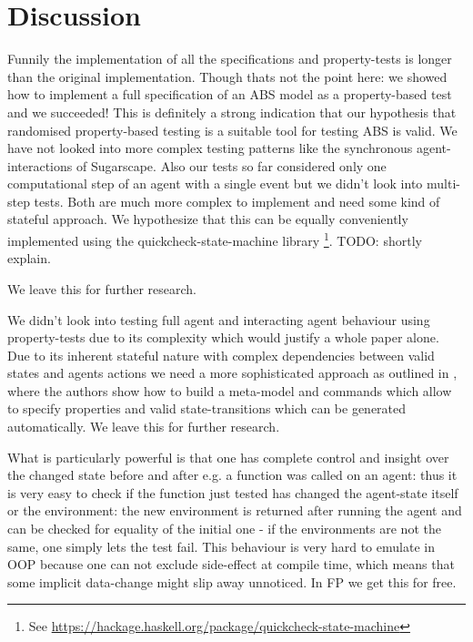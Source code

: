 \section{Discussion}
Funnily the implementation of all the specifications and property-tests is longer than the original implementation. Though thats not the point here: we showed how to implement a full specification of an ABS model as a property-based test and we succeeded! This is definitely a strong indication that our hypothesis that randomised property-based testing is a suitable tool for testing ABS is valid.
We have not looked into more complex testing patterns like the synchronous agent-interactions of Sugarscape. Also our tests so far considered only one computational step of an agent with a single event but we didn't look into multi-step tests. Both are much more complex to implement and need some kind of stateful approach. We hypothesize that this can be equally conveniently implemented using the quickcheck-state-machine library \footnote{See \url{https://hackage.haskell.org/package/quickcheck-state-machine}}. TODO: shortly explain.



We leave this for further research.  

We didn't look into testing full agent and interacting agent behaviour using property-tests due to its complexity which would justify a whole paper alone. Due to its inherent stateful nature with complex dependencies between valid states and agents actions we need a more sophisticated approach as outlined in \cite{de_vries_-depth_2019}, where the authors show how to build a meta-model and commands which allow to specify properties and valid state-transitions which can be generated automatically. We leave this for further research.

What is particularly powerful is that one has complete control and insight over the changed state before and after e.g. a function was called on an agent: thus it is very easy to check if the function just tested has changed the agent-state itself or the environment: the new environment is returned after running the agent and can be checked for equality of the initial one - if the environments are not the same, one simply lets the test fail. This behaviour is very hard to emulate in OOP because one can not exclude side-effect at compile time, which means that some implicit data-change might slip away unnoticed. In FP we get this for free.
